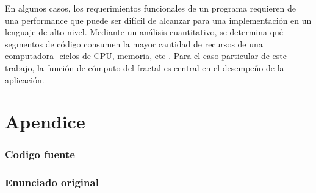 \documentclass{article}
\begin{document}
En algunos casos, los requerimientos funcionales de un programa requieren de una performance que puede ser difícil de alcanzar para una implementación en un lenguaje de alto nivel. Mediante un análisis cuantitativo, se determina qué segmentos de código consumen la mayor cantidad de recursos de una computadora -ciclos de CPU, memoria, etc-. Para el caso particular de este trabajo, la función de cómputo del fractal es central en el desempeño de la aplicación.


\clearpage

\part{Apendice}
\appendix


\section{Codigo fuente}\label{sec:source}

%
%
%

\clearpage

%
%

\clearpage

\section{Enunciado original}\label{sec:enunciado}

\end{document}
